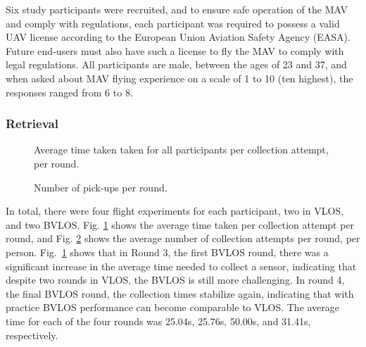 Six study participants were recruited, and to ensure safe operation of the \gls{MAV} and comply with regulations, each participant was required to possess a valid UAV license according to the European Union Aviation Safety Agency (EASA). Future end-users must also have such a license to fly the \gls{MAV} to comply with legal regulations. All participants are male, between the ages of 23 and 37, and when asked about \gls{MAV} flying experience on a scale of 1 to 10 (ten highest), the responses ranged from 6 to 8. 

\subsubsection{Retrieval}

\begin{figure}[!t]
\centering

\vspace{-0.6em}
\caption{Average time taken taken for all participants per collection attempt, per round.}
\label{fig:fig4-retrieval-time-boxplot}
\end{figure}

\begin{figure}[!t]
\centering

\vspace{-0.6em}
\caption{Number of pick-ups per round.}
\label{fig:fig4-retrieval-number-boxplot}
\end{figure}


In total, there were four flight experiments for each participant, two in \gls{VLOS}, and two \gls{BVLOS}. Fig. \ref{fig:fig4-retrieval-time-boxplot} shows the average time taken per collection attempt per round, and Fig. \ref{fig:fig4-retrieval-number-boxplot} shows the average number of  collection attempts per round, per person. Fig.~\ref{fig:fig4-retrieval-time-boxplot} shows that in Round 3, the first \gls{BVLOS} round, there was a significant increase in the average time needed to collect a sensor, indicating that despite two rounds in \gls{VLOS}, the \gls{BVLOS} is still more challenging. In round 4, the final \gls{BVLOS} round, the collection times stabilize again, indicating that with practice \gls{BVLOS} performance can become comparable to \gls{VLOS}.
The average time for each of the four rounds was 25.04s, 25.76s, 50.00s, and 31.41s, respectively. 

